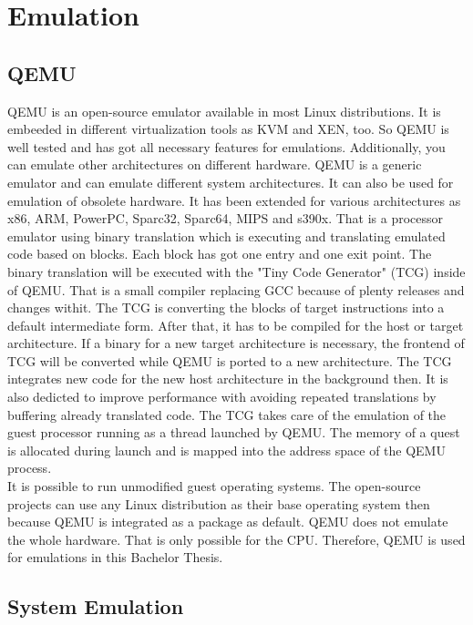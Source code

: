 
\chapter{Emulation}\label{ch:emulation}

\section{QEMU}

QEMU is an open-source emulator available in most Linux distributions. It is embeeded in different virtualization tools as KVM and XEN, too. So QEMU is well tested and has got all necessary features for emulations. 
Additionally, you can emulate other architectures on different hardware. QEMU is a generic emulator and can emulate different system architectures. It can also be used for emulation of obsolete hardware\cite[~p.24]{Opsahl2013}. 
It has been extended for various architectures as x86, ARM, PowerPC, Sparc32, Sparc64, MIPS and s390x.
That is a processor emulator using binary translation\cite{Butt2011} which is executing and translating emulated code based on blocks. Each block has got one entry and one exit point\cite[~p.5]{Wang2010}. 
The binary translation will be executed with the "Tiny Code Generator" (TCG) inside of QEMU. 
That is a small compiler replacing GCC because of plenty releases and changes withit. The TCG is converting the blocks of target instructions into a default intermediate form. 
After that, it has to be compiled for the host or target architecture. 
If a binary for a new target architecture is necessary, the frontend of TCG will be converted while QEMU is ported to a new architecture. 
The TCG integrates new code for the new host architecture in the background then. It is also dedicted to improve performance with avoiding repeated translations by buffering already translated code\cite{Cota2017}. 
The TCG takes care of the emulation of the guest processor running as a thread launched by QEMU. The memory of a quest is allocated during launch and is mapped into the address space of the QEMU process\cite[~p.29]{Opsahl2013}.\\
It is possible to run unmodified guest operating systems. The open-source projects can use any Linux distribution as their base operating system then because QEMU is integrated as a package as default. 
QEMU does not emulate the whole hardware. That is only possible for the CPU. Therefore, QEMU is used for emulations in this Bachelor Thesis.

\section{System Emulation}

